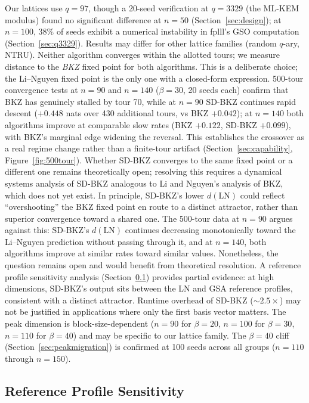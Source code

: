 \documentclass[journal=cic,version=preprint]{iacrj}
\begin{document}
Our lattices use $q=97$, though a 20-seed verification at $q=3329$ (the ML-KEM modulus) found no significant difference at $n=50$ (Section~\ref{sec:design}); at $n=100$, 38\% of seeds exhibit a numerical instability in fplll's GSO computation (Section~\ref{sec:q3329}). Results may differ for other lattice families (random $q$-ary, NTRU). Neither algorithm converges within the allotted tours; we measure distance to the \emph{BKZ} fixed point for both algorithms. This is a deliberate choice; the Li--Nguyen fixed point is the only one with a closed-form expression. 500-tour convergence tests at $n=90$ and $n=140$ ($\beta=30$, 20 seeds each) confirm that BKZ has genuinely stalled by tour 70, while at $n=90$ SD-BKZ continues rapid descent ($+0.448$ nats over 430 additional tours, vs BKZ $+0.042$); at $n=140$ both algorithms improve at comparable slow rates (BKZ $+0.122$, SD-BKZ $+0.099$), with BKZ's marginal edge widening the reversal. This establishes the crossover as a real regime change rather than a finite-tour artifact (Section~\ref{sec:capability}, Figure~\ref{fig:500tour}). Whether SD-BKZ converges to the same fixed point or a different one remains theoretically open; resolving this requires a dynamical systems analysis of SD-BKZ analogous to Li and Nguyen's analysis of BKZ, which does not yet exist. In principle, SD-BKZ's lower $d(\mathrm{LN})$ could reflect ``overshooting'' the BKZ fixed point en route to a distinct attractor, rather than superior convergence toward a shared one. The 500-tour data at $n=90$ argues against this: SD-BKZ's $d(\mathrm{LN})$ continues decreasing monotonically toward the Li--Nguyen prediction without passing through it, and at $n=140$, both algorithms improve at similar rates toward similar values. Nonetheless, the question remains open and would benefit from theoretical resolution. A reference profile sensitivity analysis (Section~\ref{sec:gsa}) provides partial evidence: at high dimensions, SD-BKZ's output sits between the LN and GSA reference profiles, consistent with a distinct attractor. Runtime overhead of SD-BKZ (${\sim}2.5\times$) may not be justified in applications where only the first basis vector matters. The peak dimension is block-size-dependent ($n=90$ for $\beta=20$, $n=100$ for $\beta=30$, $n=110$ for $\beta=40$) and may be specific to our lattice family. The $\beta=40$ cliff (Section~\ref{sec:peakmigration}) is confirmed at 100 seeds across all groups ($n=110$ through $n=150$).

\subsection{Reference Profile Sensitivity}
\label{sec:gsa}
\end{document}
